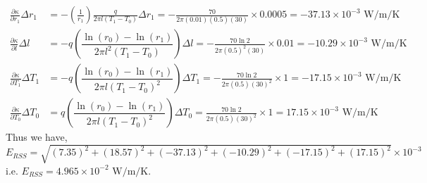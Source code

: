 \documentclass[a4paper, 11pt]{article}
\begin{document}
\begin{enumerate}[label=(\arabic*),leftmargin=*]
\begin{align*}
	\frac{\partial\kappa}{\partial r_1}\Delta{r_1}&=-\left(\frac{1}{r_1}\right)\frac{q}{2\pi l(T_1-T_0)}\Delta{r_1}=-\frac{70}{2\pi(0.01)(0.5)(30)}\times 0.0005=-37.13\times 10^{-3}\text{ W/m/K}\\
	\frac{\partial\kappa}{\partial l}\Delta{l}&=-q\left(\dfrac{\ln(r_0)-\ln(r_1)}{2\pi l^2(T_1-T_0)}\right)\Delta{l}=-\frac{70\ln 2}{2\pi (0.5)^2(30)}\times 0.01=-10.29\times 10^{-3}\text{ W/m/K}\\
	\frac{\partial\kappa}{\partial T_1}\Delta{T_1}&=-q\left(\dfrac{\ln(r_0)-\ln(r_1)}{2\pi l(T_1-T_0)^2}\right)\Delta{T_1}=-\frac{70\ln 2}{2\pi(0.5)(30)^2}\times 1=-17.15\times 10^{-3}\text{ W/m/K}\\
	\frac{\partial\kappa}{\partial T_0}\Delta{T_0}&=q\left(\dfrac{\ln(r_0)-\ln(r_1)}{2\pi l(T_1-T_0)^2}\right)\Delta{T_0}=\frac{70\ln 2}{2\pi(0.5)(30)^2}\times 1=17.15\times 10^{-3}\text{ W/m/K}
\end{align*}
Thus we have, $E_{RSS}=\sqrt{(7.35)^2+(18.57)^2+(-37.13)^2+(-10.29)^2+(-17.15)^2+(17.15)^2}\times 10^{-3}$ i.e. $\boxed{E_{RSS}=4.965\times 10^{-2}\text{ W/m/K}}$.


\end{enumerate}
\end{document}
